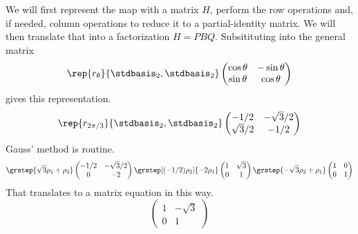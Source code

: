 \begin{ans}{2}
      We will first represent the map with a matrix $H$,
      perform the row operations and, if needed, column operations
      to reduce it to a partial-identity matrix.
      We will then translate that into a factorization $H=PBQ$.
      Subsitituting into the general matrix
          \begin{equation*}
            \rep{r_\theta}{\stdbasis_2,\stdbasis_2}
            \begin{pmatrix}
              \cos\theta  &-\sin\theta  \\
              \sin\theta  &\cos\theta
            \end{pmatrix}
          \end{equation*}
          gives this representation.
          \begin{equation*}
            \rep{r_{2\pi/3}}{\stdbasis_2,\stdbasis_2}
            \begin{pmatrix}
              -1/2        &-\sqrt{3}/2  \\
              \sqrt{3}/2  &-1/2
            \end{pmatrix}
          \end{equation*}
          Gauss' method is routine.
          \begin{equation*}
            \grstep{\sqrt{3}\rho_1+\rho_2}
            \begin{pmatrix}
              -1/2        &-\sqrt{3}/2  \\
               0          &-2
            \end{pmatrix}
            \grstep[(-1/2)\rho_2]{-2\rho_1}
            \begin{pmatrix}
               1          &\sqrt{3}    \\
               0          &1
            \end{pmatrix}
            \grstep{-\sqrt{3}\rho_2+\rho_1}
            \begin{pmatrix}
               1          &0   \\
               0          &1
            \end{pmatrix}
          \end{equation*}
          That translates to a matrix equation in this way.
          \begin{equation*}
            \begin{pmatrix}
              1  &-\sqrt{3}  \\
              0  &1
            \end{pmatrix}

\end{equation*}
\end{ans}
